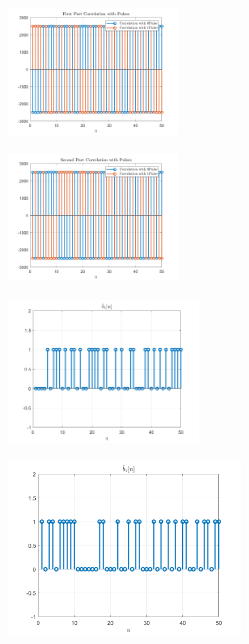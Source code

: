 \documentclass[a4paper]{article}
\begin{document}
\begin{figure}[H]
	\centering
	\end{figure}\begin{figure}[H]
	\includegraphics[width=0.4\textwidth]{comsys_fig27.png}\\ 
	\centering
	\end{figure}\begin{figure}[H]
	\includegraphics[width=0.4\textwidth]{comsys_fig28.png}\\ 
	\centering
	\end{figure}\begin{figure}[H]
	\includegraphics[width=0.45\textwidth]{comsys_fig29.png}\\ 
	\centering
	\end{figure}\begin{figure}[H]
	\includegraphics[width=0.55\textwidth]{comsys_fig30.png}\\ 

\end{figure}
\end{document}
